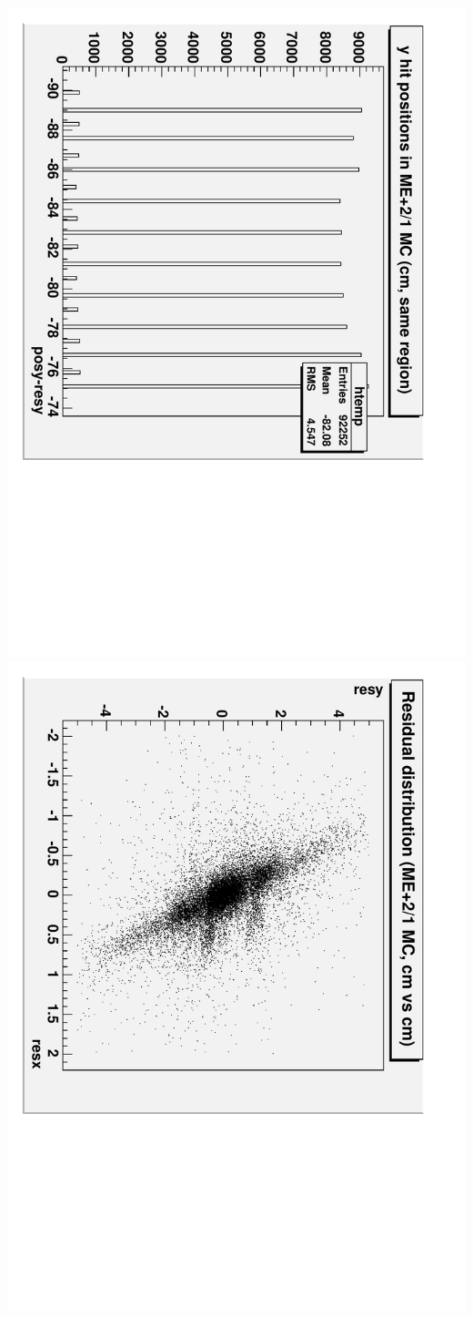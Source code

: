 \documentclass[compress]{beamer}
\begin{document}
\begin{frame}
\begin{columns}
\includegraphics[height=\linewidth, angle=90]{MC_y_hits_detail2.pdf}
\includegraphics[height=\linewidth, angle=90]{MC_residuals_ME21.pdf}
\end{columns}
\end{frame}
\end{document}
